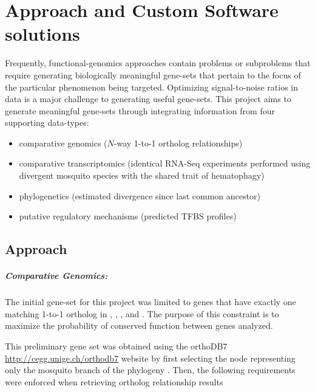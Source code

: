 
\chapter{Approach and Custom Software solutions} \label{chap:3}


Frequently, \gls{functional-genomics} approaches contain problems or subproblems that require generating biologically meaningful gene-sets that pertain to the focus of the particular phenomenon being targeted.
Optimizing signal-to-noise ratios in data is a major challenge to generating useful gene-sets.
This project aims to generate meaningful gene-sets through integrating information from four supporting data-types:

\begin{itemize}
    \item comparative genomics ($N$-way 1-to-1 ortholog relationships)
    \item comparative transcriptomics (identical \gls{RNA-Seq} experiments performed using divergent mosquito species with the shared trait of \gls{hematophagy})
    \item phylogenetics (estimated divergence since last common ancestor)
    \item putative regulatory mechanisms (predicted \gls{TFBS} profiles)
\end{itemize}



\section{Approach}

\paragraph*{Comparative Genomics:}

The initial gene-set for this project was limited to genes that have exactly one matching 1-to-1 ortholog in \Aa, \Ag, \As, and \Cq.
The purpose of this constraint is to maximize the probability of conserved function between genes analyzed. 

This preliminary gene set was obtained using the orthoDB7 \url{http://cegg.unige.ch/orthodb7} website by first selecting the node representing only the mosquito branch of the phylogeny \cite{Waterhouse2013}.
Then, the following requirements were enforced when retrieving ortholog relationship results 

